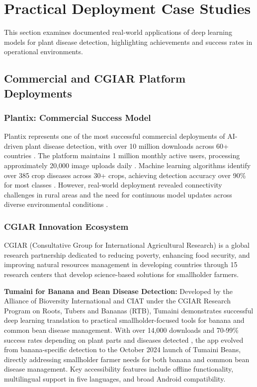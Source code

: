 \documentclass[sn-mathphys]{sn-jnl}
\theoremstyle{thmstyleone}%
\theoremstyle{thmstyletwo}%
\theoremstyle{thmstylethree}%
\begin{document}
\section{Practical Deployment Case Studies} \label{sec:practical_deployment}
This section examines documented real-world applications of deep learning models for plant disease detection, highlighting achievements and success rates in operational environments.

\subsection{Commercial and CGIAR Platform Deployments}

\subsubsection{Plantix: Commercial Success Model}

Plantix represents one of the most successful commercial deployments of AI-driven plant disease detection, with over 10 million downloads across 60+ countries \citep{strey2022plantix, peat2020plantix}. The platform maintains 1 million monthly active users, processing approximately 20,000 image uploads daily \citep{harvard2022plantix}. Machine learning algorithms identify over 385 crop diseases across 30+ crops, achieving detection accuracy over 90\% for most classes \citep{samal2018automated}. However, real-world deployment revealed connectivity challenges in rural areas and the need for continuous model updates across diverse environmental conditions \citep{acs2019plantix}.

\subsubsection{CGIAR Innovation Ecosystem}

CGIAR (Consultative Group for International Agricultural Research) is a global research partnership dedicated to reducing poverty, enhancing food security, and improving natural resources management in developing countries through 15 research centers that develop science-based solutions for smallholder farmers.

\textbf{Tumaini for Banana and Bean Disease Detection:} Developed by the Alliance of Bioversity International and CIAT under the CGIAR Research Program on Roots, Tubers and Bananas (RTB), Tumaini demonstrates successful deep learning translation to practical smallholder-focused tools for banana and common bean disease management. With over 14,000 downloads and 70-99\% success rates depending on plant parts and diseases detected \citep{tumaini2024bioversity}, the app evolved from banana-specific detection to the October 2024 launch of Tumaini Beans, directly addressing smallholder farmer needs for both banana and common bean disease management. Key accessibility features include offline functionality, multilingual support in five languages, and broad Android compatibility.
\end{document}
